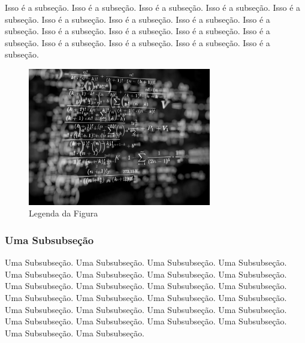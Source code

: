 \documentclass[oneside,a4paper,12pt]{article}
\begin{document}
Isso é a subseção. Isso é a subseção. Isso é a subseção. Isso é a subseção. Isso é a subseção. Isso é a subseção. Isso é a subseção. Isso é a subseção. Isso é a subseção. Isso é a subseção. Isso é a subseção. Isso é a subseção. Isso é a subseção. Isso é a subseção. Isso é a subseção. Isso é a subseção. Isso é a subseção. 


	\begin{figure}[h]
	\center
	\includegraphics[width=8cm]{Figuras/imagem.jpg}
	\caption{Legenda da Figura}
	\label{rotulodafigura}
	\end{figure}
	
\subsubsection{Uma Subsubseção} 
Uma Subsubseção. Uma Subsubseção. Uma Subsubseção. Uma Subsubseção. Uma Subsubseção. Uma Subsubseção. Uma Subsubseção. Uma Subsubseção. Uma Subsubseção. Uma Subsubseção. Uma Subsubseção. Uma Subsubseção. Uma Subsubseção. Uma Subsubseção. Uma Subsubseção. Uma Subsubseção. Uma Subsubseção. Uma Subsubseção. Uma Subsubseção. Uma Subsubseção. Uma Subsubseção. Uma Subsubseção. Uma Subsubseção. Uma Subsubseção. Uma Subsubseção. Uma Subsubseção. 	 
\end{document}
